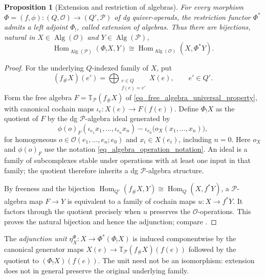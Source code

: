 \documentclass[11pt,letterpaper]{article}
\numberwithin{equation}{section}
\theoremstyle{plain}
\newtheorem{prop}[thm]{Proposition}
\theoremstyle{definition}
\theoremstyle{remark}
\newcommand{\Hom}{\operatorname{Hom}}
\newcommand{\f}{\mathfrak f}
\begin{document}
\begin{prop}[Extension and restriction of algebras]
\label{prop_change_quiver_algebra_adjunction}
For every morphism $\Phi=(f,\phi):(Q,\mathscr O)\to(Q',\mathscr P)$
of dg quiver-operads, the restriction functor $\Phi^*$ admits a left
adjoint $\Phi_!$, called \textit{extension of algebras}. Thus there
are bijections, natural in $X\in\operatorname{Alg}(\mathscr O)$ and
$Y\in\operatorname{Alg}(\mathscr P)$,
\begin{equation}\label{eq_change_quiver_algebra_adjunction}
 \operatorname{Hom}_{\operatorname{Alg}(\mathscr P)}(\Phi_!X,Y)
 \cong
 \operatorname{Hom}_{\operatorname{Alg}(\mathscr O)}(X,\Phi^*Y).
\end{equation}
\end{prop}
\begin{proof}
For the underlying $Q$-indexed family of $X$, put
\[
 (f_\#X)(e')=\bigoplus_{\substack{e\in Q\\f(e)=e'}}X(e),
 \qquad e'\in Q'.
\]
Form the free algebra $F=\mathbb T_{\mathscr P}(f_\#X)$ of
\eqref{eq_free_algebra_universal_property}, with canonical cochain maps
$\iota_e:X(e)\to F(f(e))$. Define $\Phi_!X$ as the quotient of $F$
by the dg $\mathscr P$-algebra ideal generated by
\begin{equation}\label{eq_change_quiver_algebra_relations}
 \phi(o)_F(\iota_{e_1}x_1,\ldots,\iota_{e_n}x_n)
 -\iota_{e_0}\bigl(o_X(x_1,\ldots,x_n)\bigr),
\end{equation}
for homogeneous $o\in\mathscr O(e_1,\ldots,e_n;e_0)$ and
$x_i\in X(e_i)$, including $n=0$. Here $o_X$ and $\phi(o)_F$ use
the notation \eqref{eq_algebra_operation_notation}. An ideal is a family of
subcomplexes stable under operations with at least one input in that family;
the quotient therefore inherits a dg $\mathscr P$-algebra structure.

By freeness and the bijection
$\Hom_{Q'}(f_\#X,Y)\cong\Hom_Q(X,f^*Y)$, a $\mathscr P$-algebra
map $F\to Y$ is equivalent to a family of cochain maps
$u:X\to f^*Y$. It factors through the quotient precisely when
$u$ preserves the $\mathscr O$-operations. This proves the natural
bijection and hence the adjunction; compare
\cite[\S\S~1.6 and~4]{BergerMoerdijkColoured}.
\end{proof}

The \textit{adjunction unit}
$\eta_X^\Phi:X\to\Phi^*(\Phi_!X)$ is induced componentwise by the
canonical generator maps $X(e)\to\mathbb T_{\mathscr P}(f_\#X)(f(e))$
followed by the quotient to $(\Phi_!X)(f(e))$.
The unit need not be an isomorphism:
extension does not in general preserve the original underlying family.
\end{document}
